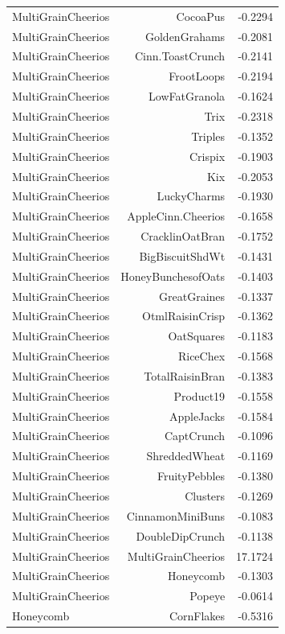 \begin{longtable}{@{}lrr@{}}
MultiGrainCheerios & CocoaPus & -0.2294 \\
MultiGrainCheerios & GoldenGrahams & -0.2081 \\
MultiGrainCheerios & Cinn.ToastCrunch & -0.2141 \\
MultiGrainCheerios & FrootLoops & -0.2194 \\
MultiGrainCheerios & LowFatGranola & -0.1624 \\
MultiGrainCheerios & Trix & -0.2318 \\
MultiGrainCheerios & Triples & -0.1352 \\
MultiGrainCheerios & Crispix & -0.1903 \\
MultiGrainCheerios & Kix & -0.2053 \\
MultiGrainCheerios & LuckyCharms & -0.1930 \\
MultiGrainCheerios & AppleCinn.Cheerios & -0.1658 \\
MultiGrainCheerios & CracklinOatBran & -0.1752 \\
MultiGrainCheerios & BigBiscuitShdWt & -0.1431 \\
MultiGrainCheerios & HoneyBunchesofOats & -0.1403 \\
MultiGrainCheerios & GreatGraines & -0.1337 \\
MultiGrainCheerios & OtmlRaisinCrisp & -0.1362 \\
MultiGrainCheerios & OatSquares & -0.1183 \\
MultiGrainCheerios & RiceChex & -0.1568 \\
MultiGrainCheerios & TotalRaisinBran & -0.1383 \\
MultiGrainCheerios & Product19 & -0.1558 \\
MultiGrainCheerios & AppleJacks & -0.1584 \\
MultiGrainCheerios & CaptCrunch & -0.1096 \\
MultiGrainCheerios & ShreddedWheat & -0.1169 \\
MultiGrainCheerios & FruityPebbles & -0.1380 \\
MultiGrainCheerios & Clusters & -0.1269 \\
MultiGrainCheerios & CinnamonMiniBuns & -0.1083 \\
MultiGrainCheerios & DoubleDipCrunch & -0.1138 \\
MultiGrainCheerios & MultiGrainCheerios & 17.1724 \\
MultiGrainCheerios & Honeycomb & -0.1303 \\
MultiGrainCheerios & Popeye & -0.0614 \\
Honeycomb & CornFlakes & -0.5316 \\

\end{longtable}
